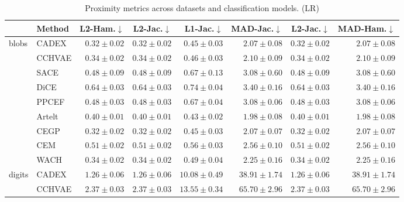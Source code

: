 \begin{table}[ht]
\centering
\caption{Proximity metrics across datasets and classification models. (LR)}
\label{tab:proximity_metrics_multinomiallogisticregression}
\begin{center}
\begin{sc}
\begin{scriptsize}
\begin{tabular}{l|l|rrrrrr}
\toprule
 & Method & L2-Ham.$\downarrow$ & L2-Jac.$\downarrow$ & L1-Jac.$\downarrow$ & MAD-Jac.$\downarrow$ & L2-Jac.$\downarrow$ & MAD-Ham.$\downarrow$ \\
\midrule
\multirow{9}{*}{blobs} & CADEX & $\boldsymbol{0.32\pm{0.02}}$ & $\boldsymbol{0.32\pm{0.02}}$ & $0.45\pm{0.03}$ & $2.07\pm{0.08}$ & $\boldsymbol{0.32\pm{0.02}}$ & $2.07\pm{0.08}$ \\
 & CCHVAE & $0.34\pm{0.02}$ & $0.34\pm{0.02}$ & $0.46\pm{0.03}$ & $2.10\pm{0.09}$ & $0.34\pm{0.02}$ & $2.10\pm{0.09}$ \\
 & SACE & $0.48\pm{0.09}$ & $0.48\pm{0.09}$ & $0.67\pm{0.13}$ & $3.08\pm{0.60}$ & $0.48\pm{0.09}$ & $3.08\pm{0.60}$ \\
 & DiCE & $0.64\pm{0.03}$ & $0.64\pm{0.03}$ & $0.74\pm{0.04}$ & $3.40\pm{0.16}$ & $0.64\pm{0.03}$ & $3.40\pm{0.16}$ \\
 & PPCEF & $0.48\pm{0.03}$ & $0.48\pm{0.03}$ & $0.67\pm{0.04}$ & $3.08\pm{0.06}$ & $0.48\pm{0.03}$ & $3.08\pm{0.06}$ \\
 & Artelt & $0.40\pm{0.01}$ & $0.40\pm{0.01}$ & $\boldsymbol{0.43\pm{0.02}}$ & $\boldsymbol{1.98\pm{0.08}}$ & $0.40\pm{0.01}$ & $\boldsymbol{1.98\pm{0.08}}$ \\
 & CEGP & $\boldsymbol{0.32\pm{0.02}}$ & $\boldsymbol{0.32\pm{0.02}}$ & $0.45\pm{0.03}$ & $2.07\pm{0.07}$ & $\boldsymbol{0.32\pm{0.02}}$ & $2.07\pm{0.07}$ \\
 & CEM & $0.51\pm{0.02}$ & $0.51\pm{0.02}$ & $0.56\pm{0.03}$ & $2.56\pm{0.10}$ & $0.51\pm{0.02}$ & $2.56\pm{0.10}$ \\
 & WACH & $0.34\pm{0.02}$ & $0.34\pm{0.02}$ & $0.49\pm{0.04}$ & $2.25\pm{0.16}$ & $0.34\pm{0.02}$ & $2.25\pm{0.16}$ \\
\midrule
\multirow{9}{*}{digits} & CADEX & $\boldsymbol{1.26\pm{0.06}}$ & $\boldsymbol{1.26\pm{0.06}}$ & $10.08\pm{0.49}$ & $38.91\pm{1.74}$ & $\boldsymbol{1.26\pm{0.06}}$ & $38.91\pm{1.74}$ \\
 & CCHVAE & $2.37\pm{0.03}$ & $2.37\pm{0.03}$ & $13.55\pm{0.34}$ & $65.70\pm{2.96}$ & $2.37\pm{0.03}$ & $65.70\pm{2.96}$ \\

\end{tabular}
\end{scriptsize}
\end{sc}
\end{center}
\end{table}
